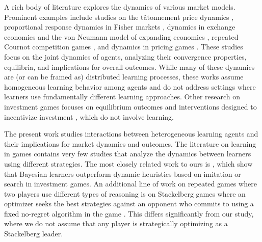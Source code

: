 A rich body of literature explores the dynamics of various market models. Prominent examples include studies on the t\^atonnement price dynamics \cite{cheung2018amortized,cole2008fast,walras1900elements}, proportional response dynamics in Fisher markets \cite{cheung2018dynamics,kolumbus2023asynchronous,zhang2011proportional}, dynamics in exchange economies \cite{branzei2021exchange,branzei2021proportional} and the von Neumann model of expanding economies \cite{branzei2018universal,branzei2025tit}, repeated Cournot competition games \cite{bischi2008learning,farrell1989renegotiation,kolumbus2022and}, and dynamics in pricing games \cite{banchio2023adaptive,hartline2024regulation,hartline2025regulation}.
These studies focus on the joint dynamics of agents, analyzing their convergence properties, equilibria, and implications for overall outcomes. While many of these dynamics are (or can be framed as) distributed learning processes, these works assume homogeneous learning behavior among agents and do not address settings where learners use fundamentally different learning approaches. 
Other research on investment games focuses on equilibrium outcomes and interventions designed to incentivize investment \cite{babaioff2022optimal,HalacKremerWinter2020raising,jackson2021systemic}, which do not involve learning.

The present work studies interactions between heterogeneous learning agents and their implications for market dynamics and outcomes. The literature on learning in games contains very few studies that analyze the dynamics between learners using different strategies. The most closely related work to ours is \cite{blumeeasley1992}, which show that Bayesian learners outperform dynamic heuristics based on imitation or search in investment games. An additional line of work 
on repeated games where two players use different types of reasoning 
is on Stackelberg games where an optimizer seeks the best strategies against an opponent who commits to using a fixed no-regret algorithm in the game \cite{arunachaleswaran2024algorithmic,arunachaleswaran2024learning,arunachaleswaran2024pareto,BravermanMaoSchneiderWeinberg2018selling,cai2023selling,guruganesh2024contracting,mansour2022strategizing}. This differs significantly from our study, where we do not assume that any player is strategically optimizing as a Stackelberg leader.  
